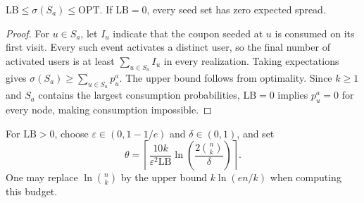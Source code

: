 \documentclass[sigconf]{acmart}
\begin{document}
\begin{lemma}
\label{lem:lower-bound}
$\mathrm{LB}\le\sigma(S_a)\le\mathrm{OPT}$.
If $\mathrm{LB}=0$, every seed set has zero expected spread.
\end{lemma}
\begin{proof}\renewcommand{\qedsymbol}{}
For $u\in S_a$, let $I_u$ indicate that the coupon seeded at $u$
is consumed on its first visit. Every such event activates a
distinct user, so the final number of activated users is at least
$\sum_{u\in S_a}I_u$ in every realization.
Taking expectations gives $\sigma(S_a)\ge\sum_{u\in S_a}p_u^a$.
The upper bound follows from optimality. Since $k\ge1$ and $S_a$
contains the largest consumption probabilities, $\mathrm{LB}=0$
implies $p_u^a=0$ for every node, making consumption impossible.
\end{proof}

For $\mathrm{LB}>0$, choose $\varepsilon\in(0,1-1/e)$ and
$\delta\in(0,1)$, and set
\begin{equation}
\label{eq:sample-budget}
 \theta=\left\lceil
 \frac{10k}{\varepsilon^2\mathrm{LB}}
 \ln\left(\frac{2\binom nk}{\delta}\right)
 \right\rceil.
\end{equation}
One may replace $\ln\binom nk$ by the upper bound $k\ln(en/k)$
when computing this budget.
\end{document}
